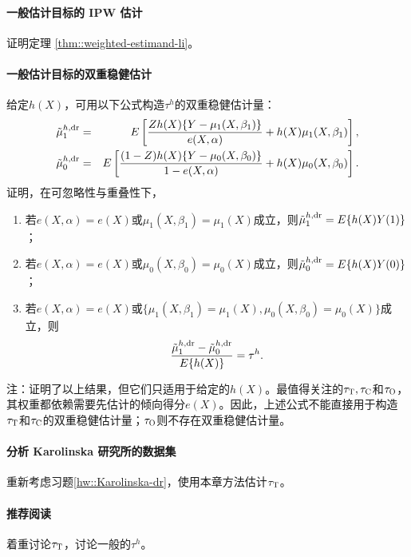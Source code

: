 \paragraph{一般估计目标的 IPW 估计}\label{problem::general-estimand-li}

证明定理 \ref{thm::weighted-estimand-li}。 


\paragraph{一般估计目标的双重稳健估计}\label{problem::general-estimand-dr}


给定$h(X)$，可用以下公式构造$\tau^h$的双重稳健估计量：
\begin{eqnarray*}
\tilde{\mu}_1^{h,\textup{dr}} &=& E\left[   \frac{Zh(X)  \{ Y-\mu_1(X,\beta_1)   \}}{  e(X,\alpha) }   + h(X) \mu_1(X, \beta_1)  \right] ,  \\
\tilde{\mu}_0^{h, \textup{dr}} &=& E\left[   \frac{(1-Z) h(X)  \{ Y-\mu_0(X,\beta_0) \}}{  1-e(X,\alpha) }   + h(X) \mu_0(X, \beta_0)  \right]  .  
\end{eqnarray*}
证明，在可忽略性与重叠性下，
\begin{enumerate}
\item
若$e(X,\alpha) = e(X)$或$\mu_1(X, \beta_1) = \mu_1(X)$成立，则$\tilde{\mu}_1^{h,\textup{dr}}= E\{  h(X)  Y(1) \}$；
\item
若$e(X,\alpha) = e(X)$或$\mu_0(X, \beta_0) = \mu_0(X)$成立，则$\tilde{\mu}_0^{h, \textup{dr}}= E\{ h(X)  Y(0) \}$；
\item 
若$e(X,\alpha) = e(X)$或$\{\mu_1(X, \beta_1) = \mu_1(X),   \mu_0(X, \beta_0) = \mu_0(X)\}$成立，则
$$
\frac{\tilde{\mu}_1^{h,\textup{dr}}  -\tilde{\mu}_0^{h, \textup{dr}}  }{  E\{ h(X)  \}  }
= \tau^h .
$$
\end{enumerate}

注：\citet{tao2019doubly}证明了以上结果，但它们只适用于给定的$h(X)$。最值得关注的$\tau_\textsc{T}, \tau_\textsc{C}$和$\tau_\textsc{O}$，其权重都依赖需要先估计的倾向得分$e(X)$。因此，上述公式不能直接用于构造$\tau_\textsc{T}$和$\tau_\textsc{C}$的双重稳健估计量；$\tau_\textsc{O}$则不存在双重稳健估计量。


\paragraph{分析 Karolinska 研究所的数据集}\label{hw::Karolinska-att}

重新考虑习题\ref{hw::Karolinska-dr}，使用本章方法估计$\tau_\textsc{T}$。 



 \paragraph{推荐阅读}
 
 \citet{shinozaki2015brief}着重讨论$\tau_\textsc{T}$，\citet{li2018balancing}讨论一般的$\tau^h$。 
 
 
 
 

